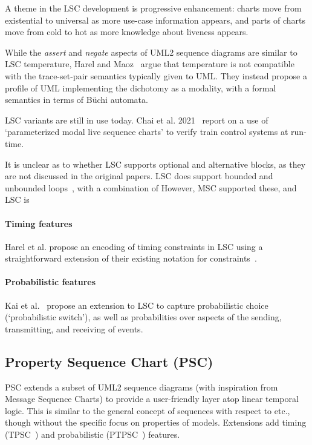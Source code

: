 A theme in the LSC development is progressive enhancement: charts move
from existential to universal as more use-case information appears,
and parts of charts move from cold to hot as more knowledge about
liveness appears.

While the \emph{assert} and \emph{negate} aspects of UML2 sequence diagrams
are similar to LSC temperature, Harel and Maoz~\cite{Harel08-ModalSD} argue
that temperature is not compatible with the trace-set-pair semantics typically
given to UML.  They instead propose a profile of UML implementing the
dichotomy as a modality, with a formal semantics in terms of B\"uchi automata.

LSC variants are still in use today. 
Chai et al. 2021~\cite{Chai21-PMLSC} report on a use of `parameterized modal
live sequence charts' to verify train control systems at run-time.

\begin{remark}
It is unclear as to whether LSC supports optional and
alternative blocks,
as they are not discussed in the original papers.
LSC does support bounded and unbounded loops~\cite{Harel03-MSC}, with a combination of
However, MSC supported these, and LSC is 
\end{remark}

\paragraph{Timing features}
Harel et al. propose an encoding of timing constraints in LSC using a
straightforward extension of their existing notation for
constraints~\cite{Harel03-MSC}.

\paragraph{Probabilistic features}
Kai et al.~\cite{Kai14-PLSC} propose an extension to LSC to capture
probabilistic choice (`probabilistic switch'), as well as
probabilities over aspects of the sending, transmitting, and receiving
of events.

\subsection{Property Sequence Chart (PSC)}

PSC extends a subset of UML2 sequence diagrams (with inspiration from
Message Sequence Charts) to provide a
user-friendly layer atop linear temporal logic.  This is
similar to the general concept of \langname{} sequences with respect to \tockcsp{}
etc., though without the
specific focus on properties of \robochart{} models.
Extensions add timing (TPSC~\cite{tpsc}) and
probabilistic (PTPSC~\cite{ptpsc}) features.

